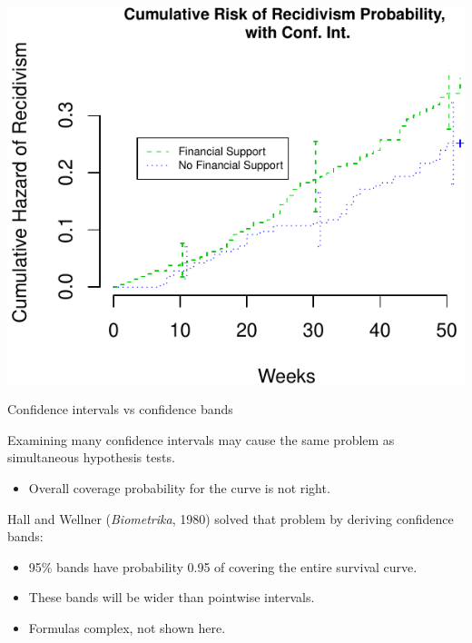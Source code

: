 \documentclass[ignorenonframetext,]{beamer}
\providecommand{\tightlist}{%
  \setlength{\itemsep}{0pt}\setlength{\parskip}{0pt}}
\begin{document}
\begin{frame}

\includegraphics{unit_02_estimation_files/figure-beamer/unnamed-chunk-8-1.pdf}

\end{frame}

\begin{frame}{%
\protect\hypertarget{confidence-intervals-vs-confidence-bands}{%
Confidence intervals vs confidence bands}}

Examining many confidence intervals may cause the same problem as
simultaneous hypothesis tests.

\begin{itemize}
\tightlist
\item
  Overall coverage probability for the curve is not right.
\end{itemize}

Hall and Wellner (\emph{Biometrika}, 1980) solved that problem by
deriving confidence bands:

\begin{itemize}
\item
  95\% bands have probability 0.95 of covering the entire survival
  curve.
\item
  These bands will be wider than pointwise intervals.
\item
  Formulas complex, not shown here.
\end{itemize}

\end{frame}
\end{document}

